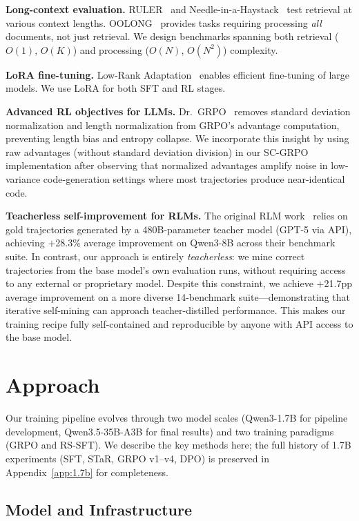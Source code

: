 \documentclass{article}
\begin{document}
\textbf{Long-context evaluation.} RULER~\cite{hsieh2024ruler} and Needle-in-a-Haystack~\cite{kamradt2023niah} test retrieval at various context lengths. OOLONG~\cite{oolong} provides tasks requiring processing \emph{all} documents, not just retrieval. We design benchmarks spanning both retrieval ($O(1)$, $O(K)$) and processing ($O(N)$, $O(N^2)$) complexity.

\textbf{LoRA fine-tuning.} Low-Rank Adaptation~\cite{hu2022lora} enables efficient fine-tuning of large models. We use LoRA for both SFT and RL stages.

\textbf{Advanced RL objectives for LLMs.} Dr.~GRPO~\cite{drgrpo} removes standard deviation normalization and length normalization from GRPO's advantage computation, preventing length bias and entropy collapse. We incorporate this insight by using raw advantages (without standard deviation division) in our SC-GRPO implementation after observing that normalized advantages amplify noise in low-variance code-generation settings where most trajectories produce near-identical code.

\textbf{Teacherless self-improvement for RLMs.} The original RLM work~\cite{zhang2026rlm} relies on gold trajectories generated by a 480B-parameter teacher model (GPT-5 via API), achieving $+$28.3\% average improvement on Qwen3-8B across their benchmark suite. In contrast, our approach is entirely \emph{teacherless}: we mine correct trajectories from the base model's own evaluation runs, without requiring access to any external or proprietary model. Despite this constraint, we achieve $+$21.7pp average improvement on a more diverse 14-benchmark suite---demonstrating that iterative self-mining can approach teacher-distilled performance. This makes our training recipe fully self-contained and reproducible by anyone with API access to the base model.

\section{Approach}
\label{sec:approach}

Our training pipeline evolves through two model scales (Qwen3-1.7B for pipeline development, Qwen3.5-35B-A3B for final results) and two training paradigms (GRPO and RS-SFT). We describe the key methods here; the full history of 1.7B experiments (SFT, STaR, GRPO v1--v4, DPO) is preserved in Appendix~\ref{app:1.7b} for completeness.

\subsection{Model and Infrastructure}
\label{sec:model}
\end{document}
